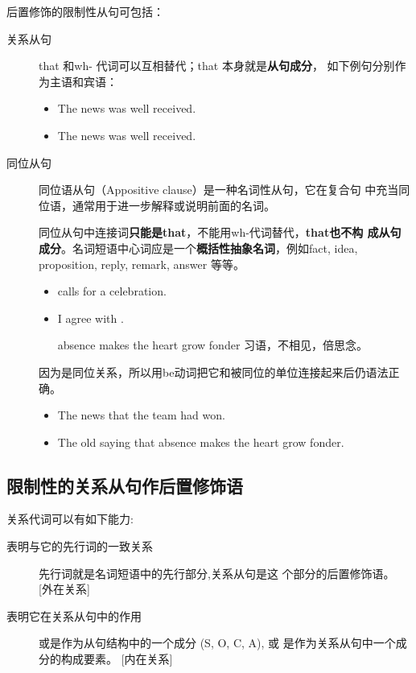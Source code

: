 后置修饰的限制性从句可包括：
\begin{description}
\item[关系从句] that 和wh- 代词可以互相替代；that 本身就是\textbf{从句成分}，
  如下例句分别作为主语和宾语：
  \begin{itemize}
  \item The news  was well received.
  \item The news  was well received.
  \end{itemize}

\item[同位从句] 同位语从句（Appositive clause）是一种名词性从句，它在复合句
  中充当同位语，通常用于进一步解释或说明前面的名词。

  同位从句中连接词\textbf{只能是that}，不能用wh-代词替代，\textbf{that也不构
    成从句成分}。名词短语中心词应是一个\textbf{概括性抽象名词}，例如fact,
  idea, proposition, reply, remark, answer 等等。
  \begin{itemize}
  \item {} calls for a celebration.

  \item I agree with .

    absence makes the heart grow fonder 习语，不相见，倍思念。
  \end{itemize}
  因为是同位关系，所以用be动词把它和被同位的单位连接起来后仍语法正确。
  \begin{itemize}
  \item The news  that the team had won.

  \item The old saying  that absence makes the heart grow fonder.
  \end{itemize}
\end{description}

\subsection{限制性的关系从句作后置修饰语}

关系代词可以有如下能力:
\begin{description}
\item[表明与它的先行词的一致关系] 先行词就是名词短语中的先行部分,关系从句是这
  个部分的后置修饰语。 [外在关系]
\item[表明它在关系从句中的作用] 或是作为从句结构中的一个成分 (S, O, C, A), 或
  是作为关系从句中一个成分的构成要素。 [内在关系]

\end{description}

